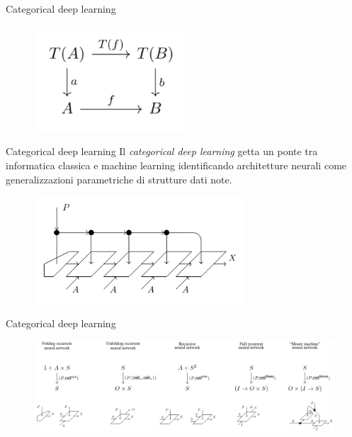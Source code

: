 \documentclass{beamer}
\begin{document}
\begin{frame}{Categorical deep learning}
    \begin{figure}
        \begin{center}
            \includegraphics[width=0.5\textwidth]{figures/algebra_hom.png}
            \caption*{}
        \end{center}
    \end{figure}
\end{frame}

\begin{frame}{Categorical deep learning}
    Il \textit{categorical deep learning} getta un ponte tra informatica classica e machine learning identificando architetture neurali come generalizzazioni parametriche di strutture dati note.

    \begin{figure}
        \begin{center}
            \includegraphics[width=0.7\textwidth]{figures/folding_rnn.png}
            \caption*{\cite{gavranovicposition}}
        \end{center}
    \end{figure}
\end{frame}

\begin{frame}{Categorical deep learning}
    \begin{figure}
        \begin{center}
            \includegraphics[width=1\textwidth]{figures/cells.png}
            \caption*{\cite{gavranovicposition}}
        \end{center}
    \end{figure}
\end{frame}
\end{document}

